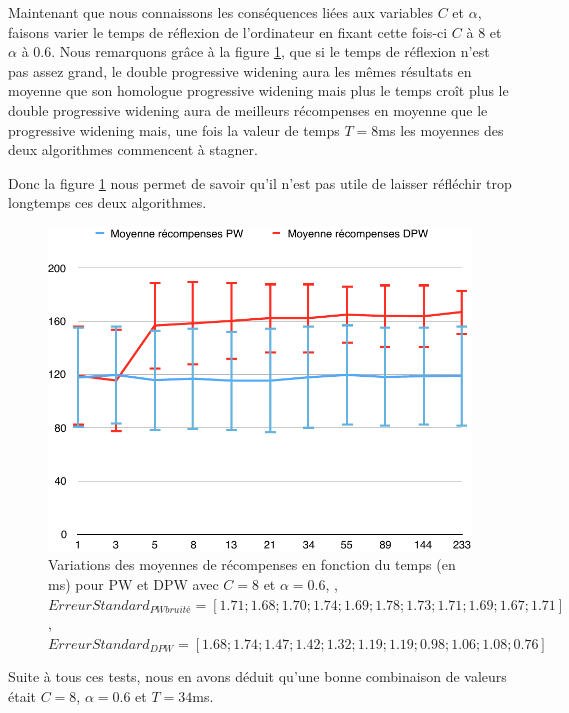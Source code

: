 \documentclass[pdftex,french, english]{article}	%
\begin{document}
    
    Maintenant que nous connaissons les conséquences liées aux variables $C$ et $\alpha$, faisons varier le temps de réflexion de l'ordinateur en fixant cette fois-ci $C$ à $8$ et $\alpha$ à $0.6$.
    Nous remarquons grâce à la figure \ref{fig:VariationDuTemps_PWvsDPW}, que si le temps de réflexion n'est pas assez grand, le double progressive widening aura les mêmes résultats en moyenne que son homologue progressive widening mais plus le temps croît plus le double progressive widening aura de meilleurs récompenses en moyenne que le progressive widening mais, une fois la valeur de temps $T=8$ms les moyennes des deux algorithmes commencent à stagner. 
    
    Donc la figure \ref{fig:VariationDuTemps_PWvsDPW} nous permet de savoir qu'il n'est pas utile de laisser réfléchir trop longtemps ces deux algorithmes.
    
    \begin{figure}[H]
		\centering
		\includegraphics[width=\textwidth]{VariationDuTemps_PWvsDPW.pdf}
		\caption{Variations des moyennes de récompenses en fonction du temps (en ms) pour PW et DPW avec $C = 8$ et $\alpha = 0.6$, , $ErreurStandard_{PWbruité} = [1.71 ; 1.68 ; 1.70 ; 1.74 ; 1.69 ; 1.78 ; 1.73 ; 1.71 ; 1.69 ; 1.67 ; 1.71]$, $ErreurStandard_{DPW} = [1.68 ; 1.74 ; 1.47 ; 1.42 ; 1.32 ; 1.19 ; 1.19 ; 0.98 ; 1.06 ; 1.08 ; 0.76]$}
		 \label{fig:VariationDuTemps_PWvsDPW}
	\end{figure}

    Suite à tous ces tests, nous en avons déduit qu'une bonne combinaison de valeurs était $C = 8$, $\alpha = 0.6$ et $T = 34$ms. 
    
\end{document}
